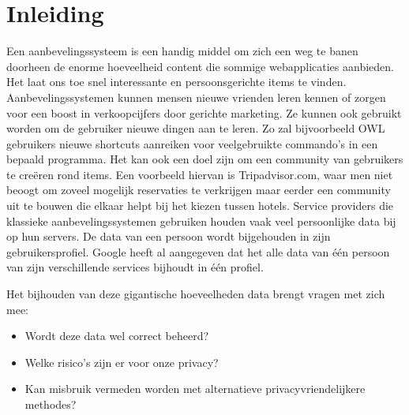\chapter{Inleiding}
\label{sec:inleiding}
Een aanbevelingssysteem is een handig middel om zich een weg te banen doorheen de enorme hoeveelheid content die sommige webapplicaties aanbieden. Het laat ons toe snel interessante en persoonsgerichte items te vinden.
Aanbevelingssystemen kunnen mensen nieuwe vrienden leren kennen of zorgen voor een boost in verkoopcijfers door gerichte marketing. Ze kunnen ook gebruikt worden om de gebruiker nieuwe dingen aan te leren. Zo zal bijvoorbeeld OWL \cite{Linton00owl} gebruikers nieuwe shortcuts aanreiken voor veelgebruikte commando's in een bepaald programma. Het kan ook een doel zijn om een community van gebruikers te cre\"eren rond items. Een voorbeeld hiervan is Tripadvisor.com, waar men niet beoogt om zoveel mogelijk reservaties te verkrijgen maar eerder een community uit te bouwen die elkaar helpt bij het kiezen tussen hotels. 
Service providers die klassieke aanbevelingssystemen gebruiken houden vaak veel persoonlijke data bij op hun servers. De data van een persoon wordt bijgehouden in zijn gebruikersprofiel. Google heeft al aangegeven dat het alle data van \'e\'en persoon van zijn verschillende services bijhoudt in \'e\'en profiel. 

Het bijhouden van deze gigantische hoeveelheden data brengt vragen met zich mee:
\begin{itemize}
 
\item Wordt deze data wel correct beheerd? 
\item Welke risico's zijn er voor onze privacy?
\item Kan misbruik vermeden worden met alternatieve privacyvriendelijkere methodes?
\end{itemize}

